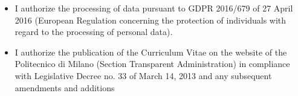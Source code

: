 \begin{itemize}
\item
I authorize the processing of data pursuant to GDPR 2016/679 of 27 April 2016 (European Regulation concerning the protection of individuals with regard to the processing of personal data).
\item
    I authorize the publication of the Curriculum Vitae on the website of the Politecnico di Milano (Section Transparent Administration) in compliance with Legislative Decree no. 33 of March 14, 2013 and any subsequent amendments and additions
\end{itemize}